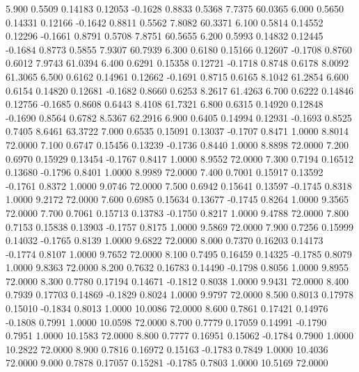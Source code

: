    5.900   0.5509   0.14183   0.12053  -0.1628   0.8833   0.5368   7.7375  60.0365
   6.000   0.5650   0.14331   0.12166  -0.1642   0.8811   0.5562   7.8082  60.3371
   6.100   0.5814   0.14552   0.12296  -0.1661   0.8791   0.5708   7.8751  60.5655
   6.200   0.5993   0.14832   0.12445  -0.1684   0.8773   0.5855   7.9307  60.7939
   6.300   0.6180   0.15166   0.12607  -0.1708   0.8760   0.6012   7.9743  61.0394
   6.400   0.6291   0.15358   0.12721  -0.1718   0.8748   0.6178   8.0092  61.3065
   6.500   0.6162   0.14961   0.12662  -0.1691   0.8715   0.6165   8.1042  61.2854
   6.600   0.6154   0.14820   0.12681  -0.1682   0.8660   0.6253   8.2617  61.4263
   6.700   0.6222   0.14846   0.12756  -0.1685   0.8608   0.6443   8.4108  61.7321
   6.800   0.6315   0.14920   0.12848  -0.1690   0.8564   0.6782   8.5367  62.2916
   6.900   0.6405   0.14994   0.12931  -0.1693   0.8525   0.7405   8.6461  63.3722
   7.000   0.6535   0.15091   0.13037  -0.1707   0.8471   1.0000   8.8014  72.0000
   7.100   0.6747   0.15456   0.13239  -0.1736   0.8440   1.0000   8.8898  72.0000
   7.200   0.6970   0.15929   0.13454  -0.1767   0.8417   1.0000   8.9552  72.0000
   7.300   0.7194   0.16512   0.13680  -0.1796   0.8401   1.0000   8.9989  72.0000
   7.400   0.7001   0.15917   0.13592  -0.1761   0.8372   1.0000   9.0746  72.0000
   7.500   0.6942   0.15641   0.13597  -0.1745   0.8318   1.0000   9.2172  72.0000
   7.600   0.6985   0.15634   0.13677  -0.1745   0.8264   1.0000   9.3565  72.0000
   7.700   0.7061   0.15713   0.13783  -0.1750   0.8217   1.0000   9.4788  72.0000
   7.800   0.7153   0.15838   0.13903  -0.1757   0.8175   1.0000   9.5869  72.0000
   7.900   0.7256   0.15999   0.14032  -0.1765   0.8139   1.0000   9.6822  72.0000
   8.000   0.7370   0.16203   0.14173  -0.1774   0.8107   1.0000   9.7652  72.0000
   8.100   0.7495   0.16459   0.14325  -0.1785   0.8079   1.0000   9.8363  72.0000
   8.200   0.7632   0.16783   0.14490  -0.1798   0.8056   1.0000   9.8955  72.0000
   8.300   0.7780   0.17194   0.14671  -0.1812   0.8038   1.0000   9.9431  72.0000
   8.400   0.7939   0.17703   0.14869  -0.1829   0.8024   1.0000   9.9797  72.0000
   8.500   0.8013   0.17978   0.15010  -0.1834   0.8013   1.0000  10.0086  72.0000
   8.600   0.7861   0.17421   0.14976  -0.1808   0.7991   1.0000  10.0598  72.0000
   8.700   0.7779   0.17059   0.14991  -0.1790   0.7951   1.0000  10.1583  72.0000
   8.800   0.7777   0.16951   0.15062  -0.1784   0.7900   1.0000  10.2822  72.0000
   8.900   0.7816   0.16972   0.15163  -0.1783   0.7849   1.0000  10.4036  72.0000
   9.000   0.7878   0.17057   0.15281  -0.1785   0.7803   1.0000  10.5169  72.0000
